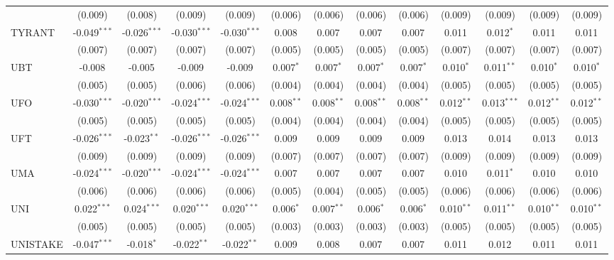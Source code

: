 \begin{table}[!htbp]
\begin{tabular}{@{\extracolsep{5pt}}lcccccccccccc}
  & (0.009) & (0.008) & (0.009) & (0.009) & (0.006) & (0.006) & (0.006) & (0.006) & (0.009) & (0.009) & (0.009) & (0.009) \\
 TYRANT & -0.049$^{***}$ & -0.026$^{***}$ & -0.030$^{***}$ & -0.030$^{***}$ & 0.008$^{}$ & 0.007$^{}$ & 0.007$^{}$ & 0.007$^{}$ & 0.011$^{}$ & 0.012$^{*}$ & 0.011$^{}$ & 0.011$^{}$ \\
  & (0.007) & (0.007) & (0.007) & (0.007) & (0.005) & (0.005) & (0.005) & (0.005) & (0.007) & (0.007) & (0.007) & (0.007) \\
 UBT & -0.008$^{}$ & -0.005$^{}$ & -0.009$^{}$ & -0.009$^{}$ & 0.007$^{*}$ & 0.007$^{*}$ & 0.007$^{*}$ & 0.007$^{*}$ & 0.010$^{*}$ & 0.011$^{**}$ & 0.010$^{*}$ & 0.010$^{*}$ \\
  & (0.005) & (0.005) & (0.006) & (0.006) & (0.004) & (0.004) & (0.004) & (0.004) & (0.005) & (0.005) & (0.005) & (0.005) \\
 UFO & -0.030$^{***}$ & -0.020$^{***}$ & -0.024$^{***}$ & -0.024$^{***}$ & 0.008$^{**}$ & 0.008$^{**}$ & 0.008$^{**}$ & 0.008$^{**}$ & 0.012$^{**}$ & 0.013$^{***}$ & 0.012$^{**}$ & 0.012$^{**}$ \\
  & (0.005) & (0.005) & (0.005) & (0.005) & (0.004) & (0.004) & (0.004) & (0.004) & (0.005) & (0.005) & (0.005) & (0.005) \\
 UFT & -0.026$^{***}$ & -0.023$^{**}$ & -0.026$^{***}$ & -0.026$^{***}$ & 0.009$^{}$ & 0.009$^{}$ & 0.009$^{}$ & 0.009$^{}$ & 0.013$^{}$ & 0.014$^{}$ & 0.013$^{}$ & 0.013$^{}$ \\
  & (0.009) & (0.009) & (0.009) & (0.009) & (0.007) & (0.007) & (0.007) & (0.007) & (0.009) & (0.009) & (0.009) & (0.009) \\
 UMA & -0.024$^{***}$ & -0.020$^{***}$ & -0.024$^{***}$ & -0.024$^{***}$ & 0.007$^{}$ & 0.007$^{}$ & 0.007$^{}$ & 0.007$^{}$ & 0.010$^{}$ & 0.011$^{*}$ & 0.010$^{}$ & 0.010$^{}$ \\
  & (0.006) & (0.006) & (0.006) & (0.006) & (0.005) & (0.004) & (0.005) & (0.005) & (0.006) & (0.006) & (0.006) & (0.006) \\
 UNI & 0.022$^{***}$ & 0.024$^{***}$ & 0.020$^{***}$ & 0.020$^{***}$ & 0.006$^{*}$ & 0.007$^{**}$ & 0.006$^{*}$ & 0.006$^{*}$ & 0.010$^{**}$ & 0.011$^{**}$ & 0.010$^{**}$ & 0.010$^{**}$ \\
  & (0.005) & (0.005) & (0.005) & (0.005) & (0.003) & (0.003) & (0.003) & (0.003) & (0.005) & (0.005) & (0.005) & (0.005) \\
 UNISTAKE & -0.047$^{***}$ & -0.018$^{*}$ & -0.022$^{**}$ & -0.022$^{**}$ & 0.009$^{}$ & 0.008$^{}$ & 0.007$^{}$ & 0.007$^{}$ & 0.011$^{}$ & 0.012$^{}$ & 0.011$^{}$ & 0.011$^{}$ \\

\end{tabular}
\end{table}
